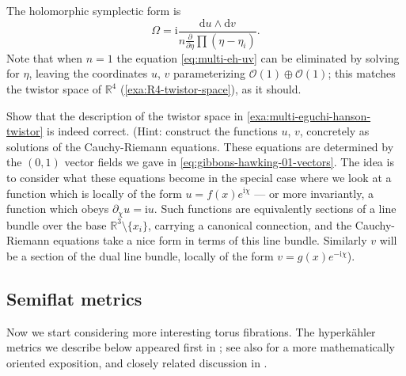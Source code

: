 \documentclass[12pt,letterpaper,reqno]{article}
\numberwithin{equation}{section}
\newcommand{\cO}{\ensuremath{\mathcal O}}
\newcommand{\R}{\ensuremath{\mathbb R}}
\newcommand{\hk}{hyperk\"ahler\xspace}
\newcommand{\I}{{\mathrm i}}
\newcommand{\de}{\mathrm{d}}
\begin{document}
\begin{example}
The holomorphic symplectic form is
\begin{equation}
  \Omega = \I \frac{\de u \wedge \de v}{n \frac{\partial}{\partial \eta} \prod (\eta - \eta_i)}.
\end{equation}
Note that when $n=1$ the equation \eqref{eq:multi-eh-uv} can be
eliminated by solving
for $\eta$, leaving the coordinates $u$, $v$ parameterizing
$\cO(1) \oplus \cO(1)$;
this matches the twistor space of $\R^4$ (\autoref{exa:R4-twistor-space}),
as it should.
\end{example}

\begin{exercise} Show that the description of the twistor space in \autoref{exa:multi-eguchi-hanson-twistor} is indeed correct.
(Hint: construct
the functions $u$, $v$, concretely as solutions of the Cauchy-Riemann equations.
These equations are determined by the $(0,1)$ vector fields we gave
in \eqref{eq:gibbons-hawking-01-vectors}. The idea is to
consider what these equations become in the special case where
we look at a function which is locally of the form $u = f(x) e^{\I \chi}$ ---
or more invariantly, a function which obeys $\partial_\chi u = \I u$.
Such functions are equivalently sections of a line bundle over
the base $\R^3 \setminus \{x_i\}$, carrying a canonical connection,
and the Cauchy-Riemann equations take a nice form in terms of this line
bundle. Similarly $v$ will be a section of the dual line bundle,
locally of the form $v = g(x) e^{-\I \chi}$).
\end{exercise}


\subsection{Semiflat metrics}

Now we start considering more interesting torus fibrations.
The \hk metrics we describe below appeared first in
\cite{Cecotti:1989qn}; see also \cite{Freed:1997dp}
for a more mathematically oriented exposition,
and closely related discussion in \cite{Hitchin:2005uu}.
\end{document}
